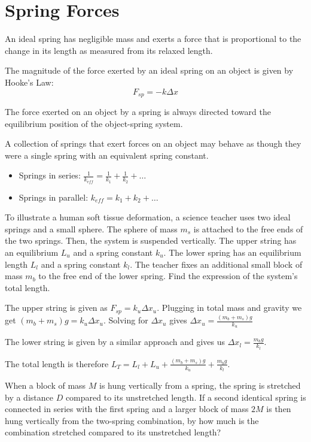 \documentclass[../mech.tex]{subfiles}
\begin{document}
\section{Spring Forces}
An ideal spring has negligible mass and exerts a force that is proportional to the change in its length as measured from its relaxed length.

The magnitude of the force exerted by an ideal spring on an object is given by Hooke's Law:
\[ F_{sp}=-k\Delta x \] 

The force exerted on an object by a spring is always directed toward the equilibrium position of the object-spring system.

A collection of springs that exert forces on an object may behave as though they were a single spring with an equivalent spring constant.
\begin{itemize}
    \item Springs in series: $\frac{1}{k_{eff}}=\frac{1}{k_1}+\frac{1}{k_2}+\dots$
    \item Springs in parallel: $k_{eff}=k_1+k_2+\dots$
\end{itemize}

\begin{example}
    To illustrate a human soft tissue deformation, a science teacher uses two ideal springs and a small sphere. The sphere of mass $m_s$ is attached to the free ends of the two springs. Then, the system is 
    suspended vertically. The upper string has an equilibrium $L_u$ and a spring constant $k_u$. The lower spring has an equilibrium length $L_l$ and a spring constant $k_l$. The teacher fixes an additional small block of mass 
    $m_b$ to the free end of the lower spring. Find the expression of the system's total length.

    The upper string is given as $F_{sp}=k_u\Delta x_u$. Plugging in total mass and gravity we get $(m_b+m_s)g=k_u\Delta x_u$. Solving for $\Delta x_u$ gives $\Delta x_u = \frac{(m_b+m_s)g}{k_u}$

    The lower string is given by a similar approach and gives us $\Delta x_l=\frac{m_b g}{k_l}$.

    The total length is therefore $L_T = L_l + L_u + \frac{(m_b+m_s)g}{k_u}+\frac{m_b g}{k_l}$.
\end{example}

\ex When a block of mass $M$ is hung vertically from a spring, the spring is stretched by a distance $D$ compared to its unstretched length. If a second identical spring is connected in series with the first spring and a larger 
block of mass $2M$ is then hung vertically from the two-spring combination, by how much is the combination stretched compared to its unstretched length?
\end{document}
